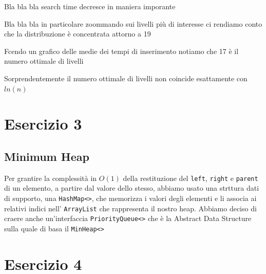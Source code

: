\documentclass[letterpaper]{report}
\begin{document}
Bla bla bla search time decresce in maniera imporante
\begin{figure}[H]
\centering
    
\end{figure}

Bla bla bla in particolare zoommando sui livelli più di interesse ci rendiamo conto
che la distribuzione è concentrata attorno a 19
\begin{figure}[H]
\centering
    
\end{figure}

Fcendo un grafico delle medie dei tempi di inserimento notiamo che 17
è il numero ottimale di livelli
\begin{figure}[H]
\centering
    
\end{figure}
Sorprendentemente il numero ottimale di livelli non coincide esattamente con $ln(n)$

\chapter*{Esercizio 3}
\section{Minimum Heap}
Per grantire la complessità in $O(1)$ della restituzione del \verb|left|, \verb|right|
e \verb|parent| di un elemento, a partire dal valore dello stesso, abbiamo usato 
una strttura dati di supporto, una \verb|HashMap<>|, che memorizza i valori degli 
elementi e li associa ai relativi indici nell' \verb|ArrayList| che rappresenta il 
nostro heap.
\newline
\newline
Abbiamo deciso di craere anche un'interfaccia \verb|PriorityQueue<>| che è la Abstract
Data Structure sulla quale di basa il \verb|MinHeap<>|

\chapter*{Esercizio 4}
\end{document}
